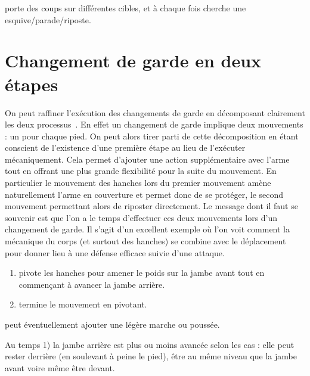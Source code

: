 \begin{exercice}
\A porte des coups sur différentes cibles, et à chaque fois \D cherche une esquive/parade/riposte.
\end{exercice}



\section{Changement de garde en deux étapes}


\label{def:texte:garde-kung-fu}
On peut raffiner l'exécution des changements de garde en décomposant clairement les deux processus~\footnotemark{}.
En effet un changement de garde implique deux mouvements : un pour chaque pied.
On peut alors tirer parti de cette décomposition en étant conscient de l'existence d'une première étape au lieu de l'exécuter mécaniquement.
Cela permet d'ajouter une action supplémentaire avec l'arme tout en offrant une plus grande flexibilité pour la suite du mouvement.
En particulier le mouvement des hanches lors du premier mouvement amène naturellement l'arme en couverture et permet donc de se protéger, le second mouvement permettant alors de riposter directement.
Le message dont il faut se souvenir est que l'on a le temps d'effectuer ces deux mouvements lors d'un changement de garde.
Il s'agit d'un excellent exemple où l'on voit comment la mécanique du corps (et surtout des hanches) se combine avec le déplacement pour donner lieu à une défense efficace suivie d'une attaque.

\begin{technique}
\label{att:tech:changement-garde-2-temps-avant}

\begin{enumerate}
	\item \A pivote les hanches pour amener le poids sur la jambe avant tout en commençant à avancer la jambe arrière.
	
	\item \A termine le mouvement en pivotant.
\end{enumerate}

\A peut éventuellement ajouter une légère marche ou poussée.

Au temps 1) la jambe arrière est plus ou moins avancée selon les cas : elle peut rester derrière (en soulevant à peine le pied), être au même niveau que la jambe avant voire même être devant.
\end{technique}


